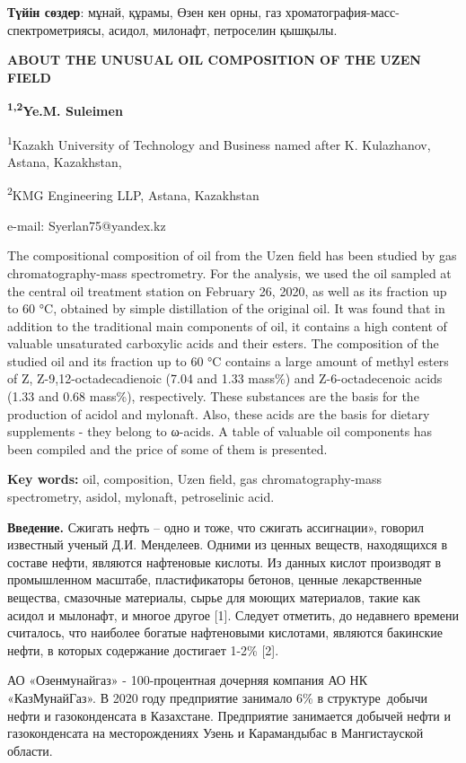 {\bfseries Түйін сөздер}: мұнай, құрамы, Өзен кен орны, газ
хроматография-масс-спектрометриясы, асидол, милонафт, петроселин
қышқылы.

{\bfseries ABOUT THE UNUSUAL OIL COMPOSITION OF THE UZEN FIELD}

{\bfseries \textsuperscript{1,2}Ye.M. Suleimen}

\textsuperscript{1}Kazakh University of Technology and Business named
after K. Kulazhanov, Astana, Kazakhstan,

\textsuperscript{2}KMG Engineering LLP, Astana, Kazakhstan

e-mail: Syerlan75@yandex.kz

The compositional composition of oil from the Uzen field has been
studied by gas chromatography-mass spectrometry. For the analysis, we
used the oil sampled at the central oil treatment station on February
26, 2020, as well as its fraction up to 60 °C, obtained by simple
distillation of the original oil. It was found that in addition to the
traditional main components of oil, it contains a high content of
valuable unsaturated carboxylic acids and their esters. The composition
of the studied oil and its fraction up to 60 °C contains a large amount
of methyl esters of Z, Z-9,12-octadecadienoic (7.04 and 1.33 mass\%) and
Z-6-octadecenoic acids (1.33 and 0.68 mass\%), respectively. These
substances are the basis for the production of acidol and mylonaft.
Also, these acids are the basis for dietary supplements - they belong to
ω-acids. A table of valuable oil components has been compiled and the
price of some of them is presented.

{\bfseries Key words:} oil, composition, Uzen field, gas
chromatography-mass spectrometry, asidol, mylonaft, petroselinic acid.

{\bfseries Введение.} Сжигать нефть -- одно и тоже, что сжигать
ассигнации», говорил известный ученый Д.И. Менделеев. Одними из ценных
веществ, находящихся в составе нефти, являются нафтеновые кислоты. Из
данных кислот производят в промышленном масштабе, пластификаторы
бетонов, ценные лекарственные вещества, смазочные материалы, сырье для
моющих материалов, такие как асидол и мылонафт, и многое другое {[}1{]}.
Следует отметить, до недавнего времени считалось, что наиболее богатые
нафтеновыми кислотами, являются бакинские нефти, в которых содержание
достигает 1-2\% {[}2{]}.

АО «Озенмунайгаз» - 100-процентная дочерняя компания АО НК
«КазМунайГаз». В 2020 году предприятие занимало 6\% в структуре~добычи
нефти и газоконденсата в Казахстане. Предприятие занимается добычей
нефти и газоконденсата на месторождениях Узень и Карамандыбас в
Мангистауской области.

